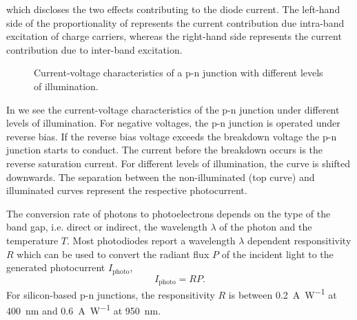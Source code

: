 which discloses the two effects contributing to the diode current.
The left-hand side of the proportionality of  represents the current contribution due intra-band excitation of charge carriers, whereas the right-hand side represents the current contribution due to inter-band excitation.
\begin{figure}[H]
	\centering
	\caption{Current-voltage characteristics of a p-n junction with different levels of illumination.}\label{fig:pn_junction_iv}
\end{figure}
In  we see the current-voltage characteristics of the p-n junction under different levels of illumination.
For negative voltages, the p-n junction is operated under reverse bias.
If the reverse bias voltage exceeds the breakdown voltage the p-n junction starts to conduct.
The current before the breakdown occurs is the reverse saturation current.
For different levels of illumination, the curve is shifted downwards.
The separation between the non-illuminated (top curve) and illuminated curves represent the respective photocurrent.

The conversion rate of photons to photoelectrons depends on the type of the band gap, i.e. direct or indirect, the wavelength $\lambda$ of the photon and the temperature $T$.
Most photodiodes report a wavelength $\lambda$ dependent responsitivity $R$ which can be used to convert the radiant flux $P$ of the incident light to the generated photocurrent $I_\text{photo}$,
\begin{equation}
	I_\text{photo}=RP
	\label{eq:responsitivity}.
\end{equation}
For silicon-based p-n junctions, the responsitivity $R$ is between \SI{0.2}{\ampere\per\watt} at \SI{400}{\nano\meter} and \SI{0.6}{\ampere\per\watt} at \SI{950}{\nano\meter}.

